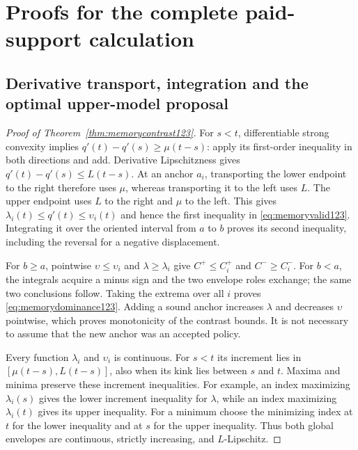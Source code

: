 \section{Proofs for the complete paid-support calculation}
\label{supp:memory123}

\subsection{Derivative transport, integration and the optimal upper-model proposal}

\begin{proof}[Proof of Theorem~\ref{thm:memorycontrast123}]
For $s<t$, differentiable strong convexity implies
$q'(t)-q'(s)\ge\mu(t-s)$: apply its first-order inequality in both
directions and add. Derivative Lipschitzness gives
$q'(t)-q'(s)\le L(t-s)$. At an anchor $a_i$, transporting the
lower endpoint to the right therefore uses $\mu$, whereas transporting
it to the left uses $L$. The upper endpoint uses $L$ to the right
and $\mu$ to the left. This gives
$\lambda_i(t)\le q'(t)\le\upsilon_i(t)$ and hence the first
inequality in \eqref{eq:memoryvalid123}. Integrating it over the
oriented interval from $a$ to $b$ proves its second inequality,
including the reversal for a negative displacement.

For $b\ge a$, pointwise
$\upsilon\le\upsilon_i$ and $\lambda\ge\lambda_i$ give
$C^+\le C_i^+$ and $C^-\ge C_i^-$. For $b<a$, the integrals
acquire a minus sign and the two envelope roles exchange; the same
two conclusions follow. Taking the extrema over all $i$ proves
\eqref{eq:memorydominance123}. Adding a sound anchor increases
$\lambda$ and decreases $\upsilon$ pointwise, which proves
monotonicity of the contrast bounds. It is not necessary to assume
that the new anchor was an accepted policy.

Every function $\lambda_i$ and $\upsilon_i$ is continuous. For
$s<t$ its increment lies in $[\mu(t-s),L(t-s)]$, also when its
kink lies between $s$ and $t$. Maxima and minima preserve these
increment inequalities. For example, an index maximizing
$\lambda_i(s)$ gives the lower increment inequality for
$\lambda$, while an index maximizing $\lambda_i(t)$ gives its
upper inequality. For a minimum choose the minimizing index at
$t$ for the lower inequality and at $s$ for the upper inequality.
Thus both global envelopes are continuous, strictly increasing,
and $L$-Lipschitz.


\end{proof}
